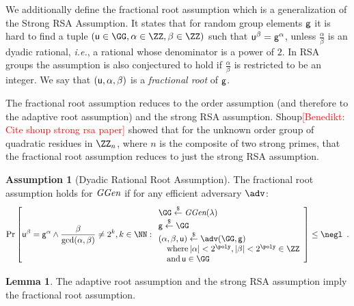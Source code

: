 \documentclass{article}
\theoremstyle{definition}
\newtheorem{lemma}{Lemma}
\newtheorem{assumption}{Assumption}
\newcommand{\benedikt}[1]{{\textcolor{red}{[Benedikt: #1]}}}
\newcommand{\benedikt}[1]{}
\begin{document}
	
We additionally define the fractional root assumption which is a generalization of the Strong RSA Assumption. It states that for random group elements $\mathsf{g}$ it is hard to find a tuple $(\gr{u}\in \GG,\alpha\in \ZZ,\beta\in \ZZ)$ such that $\mathsf{u}^{\beta}=\mathsf{g}^{\alpha}$, unless $\frac{\alpha}{\beta}$ is an dyadic rational, \emph{i.e.}, a rational whose denominator is a power of $2$. In RSA groups the assumption is also conjectured to hold if $\frac{\alpha}{\beta}$ is restricted to be an integer. We say that $(\mathsf{u},\alpha,\beta)$ is a \emph{fractional root} of $\mathsf{g}$.

 The fractional root assumption reduces to the order assumption (and therefore to the adaptive root assumption) and the strong RSA assumption. Shoup\benedikt{Cite shoup strong rsa paper} showed that for the unknown order group of quadratic residues in $\ZZ_n$, where $n$ is the composite of two strong primes, that the fractional root assumption reduces to just the strong RSA assumption.
\begin{assumption}[Dyadic Rational Root Assumption]
\label{assum:fracroot}
The fractional root assumption holds for $\textit{GGen}$ if for any efficient adversary $\adv$:
\[        
                \Pr\left[\gr{u}^\beta = \gr{g}^{\alpha} \wedge \frac{\beta}{\gcd(\alpha,\beta)}\neq 2^k,  k \in \NN   : 
                \begin{array}{l} 
                      \GG \sample \ggen(\lambda) \\ 
                      \gr{g} \sample \GG \\
                      (\alpha, \beta, \gr{u}) \sample \adv(\GG, \gr{g}) \\
                      \quad \textnormal{where} \, |\alpha|<2^{\poly}, |\beta|<2^{\poly} \in \ZZ \\
                      \quad \textnormal{and} \, \gr{u} \in \GG 
                \end{array} 
        \right] \leq \negl \enspace .
\]
\end{assumption}
\begin{lemma}
	The adaptive root assumption and the strong RSA assumption imply the fractional root assumption.
\end{lemma}
\end{document}
